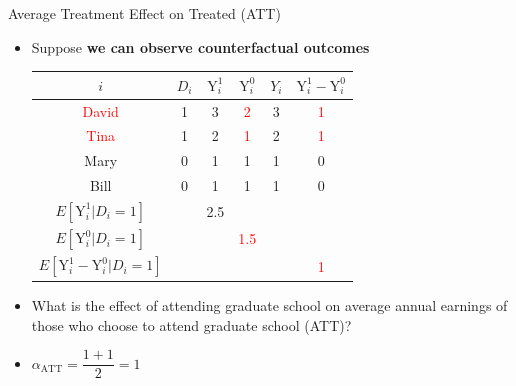 \documentclass[hyperref={pdfpagelabels=false}]{beamer}
\begin{document}
\begin{frame}{Average Treatment Effect on Treated (ATT)}
\begin{itemize}
\item Suppose \textbf{we can observe counterfactual outcomes}
\vspace{0.2cm}
\begin{center}
	\begin{threeparttable}
		\centering\footnotesize
		\begin{tabular}{cccccc}
			\toprule
			$i$ & $D_i$ & $\mathrm{Y}^{1}_{i}$ & $\mathrm{Y}^{0}_{i}$ & $Y_i$ & $\mathrm{Y}^{1}_{i}-\mathrm{Y}^{0}_{i}$  \\
			\midrule
			\textcolor{red}{David} & 1 & 3 & \textcolor{red}2 & 3 & \textcolor{red}1 \\
			\textcolor{red}{Tina} & 1 & 2 & \textcolor{red}1 & 2 & \textcolor{red}1 \\
			Mary & 0 & 1 & 1 & 1 & 0 \\
			Bill & 0 & 1 & 1 & 1 & 0 \\
			\midrule
			$E[\mathrm{Y}^{1}_{i}| D_i=1]$     & & 2.5 &     &  &     \\
			$E[\mathrm{Y}^{0}_{i}| D_i=1]$     &     & & \textcolor{red}{1.5} &  &     \\
			\midrule
			$E[\mathrm{Y}^{1}_{i}-\mathrm{Y}^{0}_{i}| D_i=1]$ &     &     &  &  & \textcolor{red}1 \\
			\bottomrule
		\end{tabular}
	\end{threeparttable}
\end{center}

\vspace{0.2cm}
\item What is the effect of attending graduate school on average annual earnings of those who choose to attend graduate school (ATT)?
\vspace{0.2cm}
\item $\alpha_{\text{ATT}}= \dfrac{1+1}{2} = 1$
\end{itemize}

\end{frame}
\end{document}
